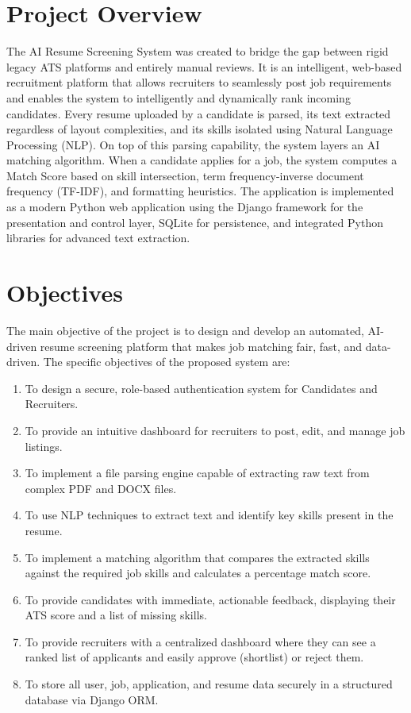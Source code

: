 \documentclass[12pt,a4paper]{report}
\begin{document}
\section{Project Overview}
\noindent The AI Resume Screening System was created to bridge the gap between rigid legacy ATS platforms and entirely manual reviews. It is an intelligent, web-based recruitment platform that allows recruiters to seamlessly post job requirements and enables the system to intelligently and dynamically rank incoming candidates. 
\noindent Every resume uploaded by a candidate is parsed, its text extracted regardless of layout complexities, and its skills isolated using Natural Language Processing (NLP). On top of this parsing capability, the system layers an AI matching algorithm. When a candidate applies for a job, the system computes a Match Score based on skill intersection, term frequency-inverse document frequency (TF-IDF), and formatting heuristics.
\noindent The application is implemented as a modern Python web application using the Django framework for the presentation and control layer, SQLite for persistence, and integrated Python libraries for advanced text extraction.

\section{Objectives}
\noindent The main objective of the project is to design and develop an automated, AI-driven resume screening platform that makes job matching fair, fast, and data-driven.
\noindent The specific objectives of the proposed system are:
\begin{enumerate}
\item To design a secure, role-based authentication system for Candidates and Recruiters.
\item To provide an intuitive dashboard for recruiters to post, edit, and manage job listings.
\item To implement a file parsing engine capable of extracting raw text from complex PDF and DOCX files.
\item To use NLP techniques to extract text and identify key skills present in the resume.
\item To implement a matching algorithm that compares the extracted skills against the required job skills and calculates a percentage match score.
\item To provide candidates with immediate, actionable feedback, displaying their ATS score and a list of missing skills.
\item To provide recruiters with a centralized dashboard where they can see a ranked list of applicants and easily approve (shortlist) or reject them.
\item To store all user, job, application, and resume data securely in a structured database via Django ORM.
\end{enumerate}
\end{document}
